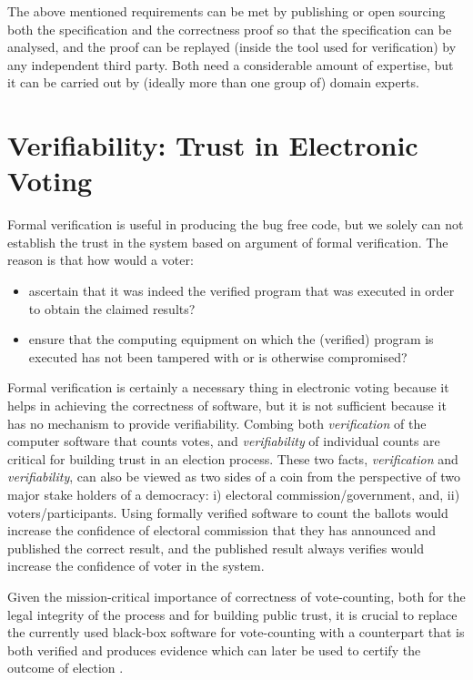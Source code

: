 	\noindent
	The above mentioned requirements can be met by publishing or open sourcing
	both the
	specification and the correctness proof so that the specification
	can be analysed, and the proof can be replayed (inside the tool used for 
	verification) by any independent third party. Both need a
	considerable amount of expertise, but it can be carried out by (ideally
	more than one group of) domain experts.
	

	
	  
	 
		
 \section{Verifiability: Trust in Electronic Voting}
 \label{sec:varifiability}
  Formal verification is useful in producing the 
   bug free code, but we solely can not 
   establish the trust in the system based on argument of 
   formal verification. The reason is that how would a voter:
   \begin{itemize}
   \item ascertain that it was indeed the verified program that was
	executed in order to obtain the claimed results?
	
   \item ensure that the computing equipment on which the (verified)
	program is executed has not been tampered with or is otherwise
	compromised?
	
   \end{itemize}
   
   \noindent
   Formal verification is certainly a necessary thing in electronic voting because 
   it helps in achieving the correctness of software, but it is not sufficient because
   it has no mechanism to provide  verifiability.
   Combing both \emph{verification} of the
	computer software that counts votes, and
	\emph{verifiability} of individual counts are critical for
	building trust in an election process. These two facts, 
	 \emph{verification}  and \emph{verifiability}, 
	 can also be viewed as 
    two sides of a coin from the perspective of two major stake holders of 
    a democracy: i) electoral commission/government, and, ii) voters/participants.  
    Using formally 
    verified software to count the ballots would increase the confidence 
    of electoral commission that they has announced and published the correct result, and 
    the published result always verifies would increase the confidence
    of voter in the system. 
	 
	 
	Given the mission-critical importance of
	 correctness of vote-counting,
	both for the legal integrity of the process and for
	building public trust,  it is crucial to replace the
	currently used black-box software for vote-counting with a
	counterpart that is both verified and produces 
	evidence which can later be used to certify
	the outcome of election \citep{Bernhard:2017:PES} \citep{Rivest:2008:PTRS}.
	
